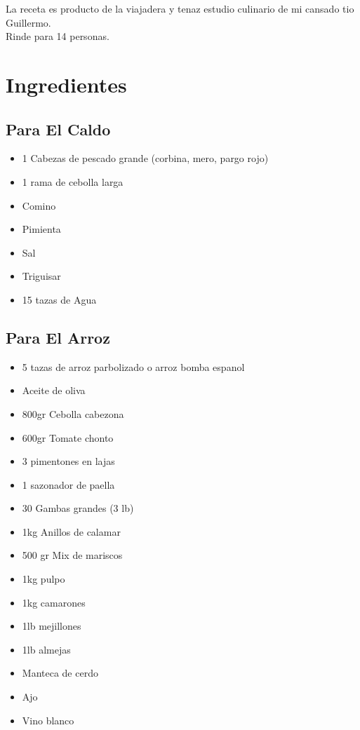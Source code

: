 La receta es producto de la viajadera y tenaz estudio culinario de mi cansado tio Guillermo.\\

Rinde para 14 personas.


\section*{Ingredientes}
\subsection*{Para El Caldo}
\begin{itemize}
\setlength{\itemsep}{0pt}
\setlength{\parsep}{0pt} \setlength{\parskip}{0pt}
\item 1 Cabezas de pescado grande (corbina, mero, pargo rojo)
\item 1 rama de cebolla larga
\item Comino
\item Pimienta
\item Sal
\item Triguisar
\item 15 tazas de Agua
\end{itemize}
\subsection*{Para El Arroz}
\begin{itemize}
\setlength{\itemsep}{0pt}
\setlength{\parsep}{0pt} \setlength{\parskip}{0pt}
\item 5 tazas de arroz parbolizado o arroz bomba espanol
\item Aceite de oliva
\item 800gr Cebolla cabezona
\item 600gr Tomate chonto
\item 3 pimentones en lajas
\item 1 sazonador de paella
\item 30 Gambas grandes (3 lb)
\item 1kg Anillos de calamar
\item 500 gr Mix de mariscos
\item 1kg pulpo
\item 1kg camarones
\item 1lb mejillones
\item 1lb almejas
\item Manteca de cerdo
\item Ajo
\item Vino blanco
\end{itemize}
